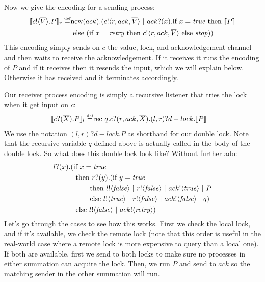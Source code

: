 Now we give the encoding for a sending process:
\begin{equation*}\begin{split}
	\llbracket{ \ensuremath{{c}!\langle{ \ensuremath{\overline{V}} }\rangle.} P}\rrbracket_r \overset{\mbox{\tiny{def}}}{=} & \text{new}({ack}).({c}!\langle{r,ack, \ensuremath{\overline{V}} }\rangle \ |\  {ack}?({x}). \text{if } {x= \ensuremath{\text{\emph{true}}} } \text{ then } \llbracket{P}\rrbracket \\
	&\text{ else } (\text{if } {x= \ensuremath{\text{\emph{retry}}} } \text{ then } {c}!\langle{r,ack, \ensuremath{\overline{V}} }\rangle \text{ else } \mbox{\emph{stop}}))
\end{split}\end{equation*}
This encoding simply sends on $c$ the value, lock, and acknowledgement channel and then waits to receive the acknowledgement.  
If it receives \ptrue it runs the encoding of $P$ and if it receives \pretry then it resends the input, which we will explain below.  Otherwise it has received \pfalse and it terminates accordingly.

Our receiver process encoding is simply a recursive listener that tries the lock when it get input on $c$:
\begin{equation*}\begin{split}
	\llbracket{ \ensuremath{{c}?({\overline{X}}).} P}\rrbracket_l \overset{\mbox{\tiny{def}}}{=} & \text{rec }{q}.{c}?({r,ack,\overline{X}}). (l,r)?d-lock.\llbracket{P}\rrbracket
\end{split}\end{equation*}
We use the notation $(l,r)?d-lock.P$ as shorthand for our double lock.
Note that the recursive variable $q$ defined above is actually called in the body of the double lock.
So what does this double lock look like?  Without further ado:
\begin{equation}\begin{split}
	{l}?({x}).(&\text{if } {x= \ensuremath{\text{\emph{true}}} }\\
	&\text{ then } {r}?({y}). (\text{if } {y= \ensuremath{\text{\emph{true}}} }\\
	&\ \ \ \ \ \ \text{ then } {l}!\langle{ \ensuremath{\text{\emph{false}}} }\rangle \ |\  {r}!\langle{ \ensuremath{\text{\emph{false}}} }\rangle \ |\  {ack}!\langle{ \ensuremath{\text{\emph{true}}} }\rangle \ |\  P\\
	&\ \ \ \ \ \ \text{ else } {l}!\langle{ \ensuremath{\text{\emph{true}}} }\rangle \ |\  {r}!\langle{ \ensuremath{\text{\emph{false}}} }\rangle \ |\  {ack}!\langle{ \ensuremath{\text{\emph{false}}} }\rangle \ |\  q)\\
	&\text{ else }{l}!\langle{ \ensuremath{\text{\emph{false}}} }\rangle \ |\  {ack}!\langle{ \ensuremath{\text{\emph{retry}}} }\rangle)\\
\end{split}\end{equation}%
Let's go through the cases to see how this works.  
First we check the local lock, and if it's available, we check the remote lock (note that this order is useful in the real-world case where a remote lock is more expensive to query than a local one).  
If both are available, first we send \pfalse to both locks to make sure no processes in either summation can acquire the lock.  
Then, we run $P$ and send \ptrue to $ack$ so the matching sender in the other summation will run.

